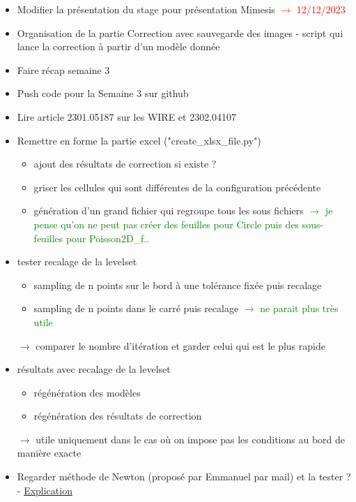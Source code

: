 \begin{itemize}[label=$\square$]
	\item Modifier la présentation du stage pour présentation Mimesis \textcolor{red}{$\rightarrow$ 12/12/2023}
	\item[\done] Organisation de la partie Correction avec sauvegarde des images - script qui lance la correction à partir d'un modèle donnée
	\item[\done] Faire récap semaine 3
	\item[\done] Push code pour la Semaine 3 sur github
	\item[\done] Lire article 2301.05187 sur les WIRE et 2302.04107
	\item[\done] Remettre en forme la partie excel ("create\_xlsx\_file.py")
	\begin{itemize}[label=\LARGE $\circ$]
		\item[\sdone] ajout des résultats de correction si existe ?
		\item[\sdone] griser les cellules qui sont différentes de la configuration précédente
		\item[\swontfix] génération d'un grand fichier qui regroupe tous les sous fichiers \textcolor{Green}{$\rightarrow$ je pense qu'on ne peut pas créer des feuilles pour Circle puis des sous-feuilles pour Poisson2D\_f..}		
	\end{itemize}
	\item[\done] tester recalage de la levelset
	\begin{itemize}[label=\LARGE $\circ$]
		\item[\sdone] sampling de n points sur le bord à une tolérance fixée puis recalage
		\item[\swontfix] sampling de n points dans le carré puis recalage \textcolor{green}{$\rightarrow$ ne parait plus très utile}
	\end{itemize}
	$\rightarrow$ comparer le nombre d'itération et garder celui qui est le plus rapide
	\item[\done] résultats avec recalage de la levelset
	\begin{itemize}[label=\LARGE $\circ$]
		\item[\sdone] régénération des modèles 
		\item[\sdone] régénération des résultats de correction
	\end{itemize}
	$\rightarrow$ utile uniquement dans le cas où on impose pas les conditions au bord de manière exacte
	\item Regarder méthode de Newton (proposé par Emmanuel par mail) et la tester ? - \href{https://www.mathweb.fr/euclide/methode-de-newton/}{Explication}

\end{itemize}

